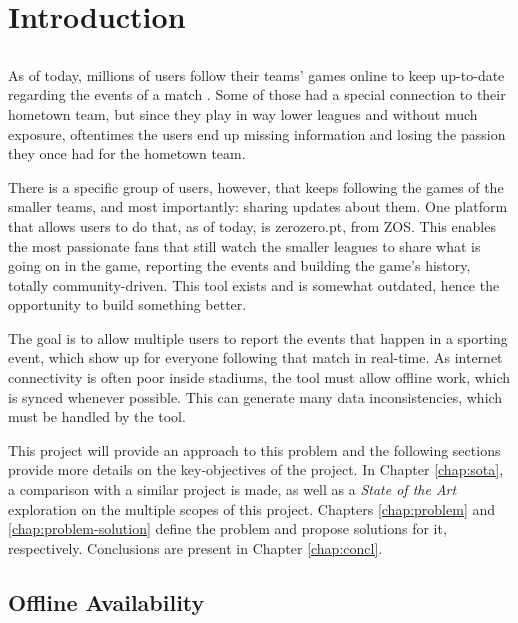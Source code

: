 \chapter{Introduction} \label{chap:intro}

\section*{}

As of today, millions of users follow their teams' games online to keep up-to-date regarding the events of a match \cite{facebook-livestream-stats}. Some of those had a special connection to their hometown team, but since they play in way lower leagues and without much exposure, oftentimes the users end up missing information and losing the passion they once had for the hometown team.

There is a specific group of users, however, that keeps following the games of the smaller teams, and most importantly: sharing updates about them. One platform that allows users to do that, as of today, is zerozero.pt, from ZOS. This enables the most passionate fans that still watch the smaller leagues to share what is going on in the game, reporting the events and building the game's history, totally community-driven. This tool exists and is somewhat outdated, hence the opportunity to build something better.

The goal is to allow multiple users to report the events that happen in a sporting event, which show up for everyone following that match in real-time. As internet connectivity is often poor inside stadiums, the tool must allow offline work, which is synced whenever possible. This can generate many data inconsistencies, which must be handled by the tool.

This project will provide an approach to this problem and the following sections provide more details on the key-objectives of the project. In Chapter \ref{chap:sota}, a comparison with a similar project is made, as well as a \textit{State of the Art} exploration on the multiple scopes of this project. Chapters \ref{chap:problem} and \ref{chap:problem-solution} define the problem and propose solutions for it, respectively. Conclusions are present in Chapter \ref{chap:concl}. 

\section{Offline Availability} \label{sec:offline-avail-intro}

